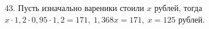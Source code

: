 43. Пусть изначально вареники стоили $x$ рублей, тогда $x\cdot1,2\cdot0,95\cdot1,2=171,\ 1,368x=171,\ x=125$ рублей.\\
